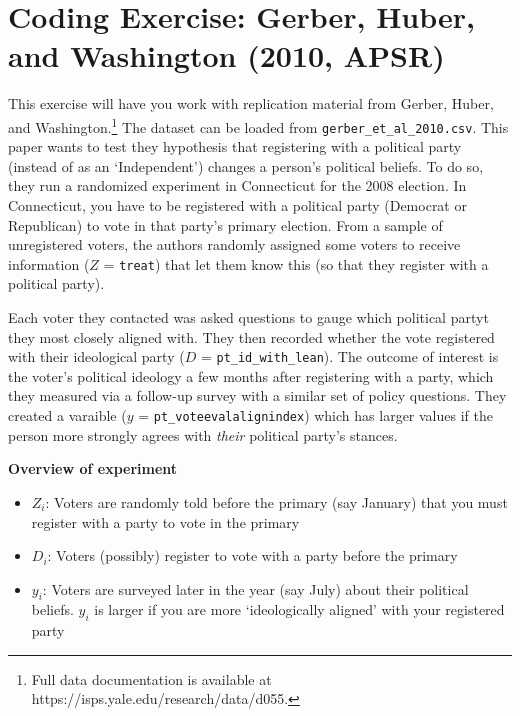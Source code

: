 \documentclass[12pt]{article}
\begin{document}
\section*{Coding Exercise: Gerber, Huber, and Washington (2010, APSR)}

This exercise will have you work with replication material from Gerber, Huber, and Washington.\footnote{Full data documentation is available at https://isps.yale.edu/research/data/d055.}
The dataset can be loaded from \texttt{gerber\_et\_al\_2010.csv}.
This paper wants to test they hypothesis that registering with a political party (instead of as an `Independent') changes a person's political beliefs. 
To do so, they run a randomized experiment in Connecticut for the 2008 election. 
In Connecticut, you have to be registered with a political party (Democrat or Republican) to vote in that party's primary election. 
From a sample of unregistered voters, the authors randomly assigned some voters to receive information ($Z$ = \texttt{treat}) that let them know this (so that they register with a political party).

Each voter they contacted was asked questions to gauge which political partyt they most closely aligned with. 
They then recorded whether the vote registered with their ideological party ($D$ = \texttt{pt\_id\_with\_lean}). 
The outcome of interest is the voter's political ideology a few months after registering with a party, which they measured via a follow-up survey with a similar set of policy questions. 
They created a varaible ($y$ = \texttt{pt\_voteevalalignindex}) which has larger values if the person more strongly agrees with \emph{their} political party's stances.

\textbf{Overview of experiment}
\begin{itemize}
  \item $Z_i$: Voters are randomly told before the primary (say January) that you must register with a party to vote in the primary
  
  \item $D_i$: Voters (possibly) register to vote with a party before the primary
  
  \item $y_i$: Voters are surveyed later in the year (say July) about their political beliefs. $y_i$ is larger if you are more `ideologically aligned' with your registered party
\end{itemize}
\end{document}
